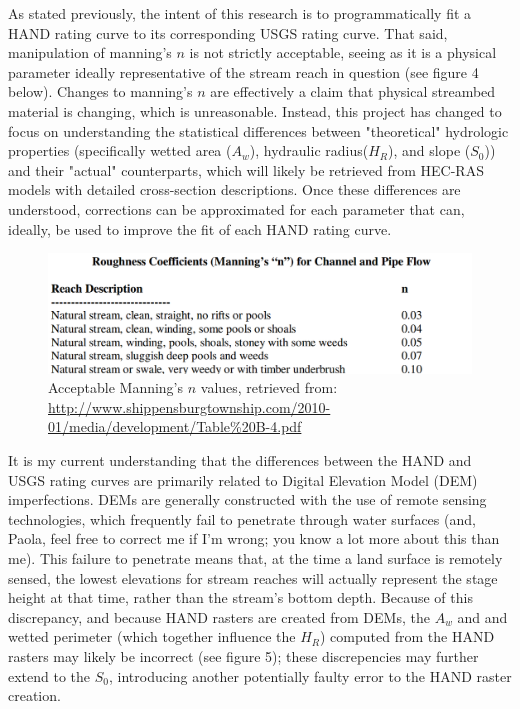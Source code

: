 \documentclass[11pt]{article}
\begin{document}
\clearpage

As stated previously, the intent of this research is to programmatically fit a HAND rating curve to its corresponding USGS rating curve. That said, manipulation of manning's $n$ is not strictly acceptable, seeing as it is a physical parameter ideally representative of the stream reach in question (see figure 4 below). Changes to manning's $n$ are effectively a claim that physical streambed material is changing, which is unreasonable. Instead, this project has changed to focus on understanding the statistical differences between "theoretical" hydrologic properties (specifically wetted area ($A_w$), hydraulic radius($H_R$), and slope ($S_0$)) and their "actual" counterparts, which will likely be retrieved from HEC-RAS models with detailed cross-section descriptions. Once these differences are understood, corrections can be approximated for each parameter that can, ideally, be used to improve the fit of each HAND rating curve. 

\begin{figure}[h]
\centering
\includegraphics[keepaspectratio, width=.8\textwidth]{n_vals.png}
\caption{Acceptable Manning's $n$ values, retrieved from: \url{http://www.shippensburgtownship.com/2010-01/media/development/Table\%20B-4.pdf}} \label{fig:1}
\end{figure}

It is my current understanding that the differences between the HAND and USGS rating curves are primarily related to Digital Elevation Model (DEM) imperfections. DEMs are generally constructed with the use of remote sensing technologies, which frequently fail to penetrate through water surfaces (and, Paola, feel free to correct me if I'm wrong; you know a lot more about this than me). This failure to penetrate means that, at the time a land surface is remotely sensed, the lowest elevations for stream reaches will actually represent the stage height at that time, rather than the stream's bottom depth. Because of this discrepancy, and because HAND rasters are created from DEMs, the $A_w$ and and wetted perimeter (which together influence the $H_R$) computed from the HAND rasters may likely be incorrect (see figure 5); these discrepencies may further extend to the $S_0$, introducing another potentially faulty error to the HAND raster creation. 
\end{document}
